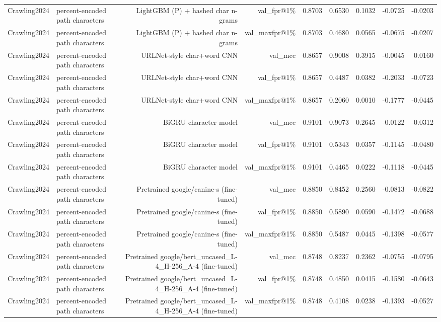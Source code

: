 \begin{table}[t]
\begin{tabular}{llrrrrrrr}
Crawling2024 & percent-encoded path characters & LightGBM (P) + hashed char n-grams & val\_fpr@1\% & 0.8703 & 0.6530 & 0.1032 & -0.0725 & -0.0203 \\
Crawling2024 & percent-encoded path characters & LightGBM (P) + hashed char n-grams & val\_maxfpr@1\% & 0.8703 & 0.4680 & 0.0565 & -0.0675 & -0.0207 \\
Crawling2024 & percent-encoded path characters & URLNet-style char+word CNN & val\_mcc & 0.8657 & 0.9008 & 0.3915 & -0.0045 & 0.0160 \\
Crawling2024 & percent-encoded path characters & URLNet-style char+word CNN & val\_fpr@1\% & 0.8657 & 0.4487 & 0.0382 & -0.2033 & -0.0723 \\
Crawling2024 & percent-encoded path characters & URLNet-style char+word CNN & val\_maxfpr@1\% & 0.8657 & 0.2060 & 0.0010 & -0.1777 & -0.0445 \\
Crawling2024 & percent-encoded path characters & BiGRU character model & val\_mcc & 0.9101 & 0.9073 & 0.2645 & -0.0122 & -0.0312 \\
Crawling2024 & percent-encoded path characters & BiGRU character model & val\_fpr@1\% & 0.9101 & 0.5343 & 0.0357 & -0.1145 & -0.0480 \\
Crawling2024 & percent-encoded path characters & BiGRU character model & val\_maxfpr@1\% & 0.9101 & 0.4465 & 0.0222 & -0.1118 & -0.0445 \\
Crawling2024 & percent-encoded path characters & Pretrained google/canine-s (fine-tuned) & val\_mcc & 0.8850 & 0.8452 & 0.2560 & -0.0813 & -0.0822 \\
Crawling2024 & percent-encoded path characters & Pretrained google/canine-s (fine-tuned) & val\_fpr@1\% & 0.8850 & 0.5890 & 0.0590 & -0.1472 & -0.0688 \\
Crawling2024 & percent-encoded path characters & Pretrained google/canine-s (fine-tuned) & val\_maxfpr@1\% & 0.8850 & 0.5487 & 0.0445 & -0.1398 & -0.0577 \\
Crawling2024 & percent-encoded path characters & Pretrained google/bert\_uncased\_L-4\_H-256\_A-4 (fine-tuned) & val\_mcc & 0.8748 & 0.8237 & 0.2362 & -0.0755 & -0.0795 \\
Crawling2024 & percent-encoded path characters & Pretrained google/bert\_uncased\_L-4\_H-256\_A-4 (fine-tuned) & val\_fpr@1\% & 0.8748 & 0.4850 & 0.0415 & -0.1580 & -0.0643 \\
Crawling2024 & percent-encoded path characters & Pretrained google/bert\_uncased\_L-4\_H-256\_A-4 (fine-tuned) & val\_maxfpr@1\% & 0.8748 & 0.4108 & 0.0238 & -0.1393 & -0.0527 \\

\end{tabular}
\end{table}
